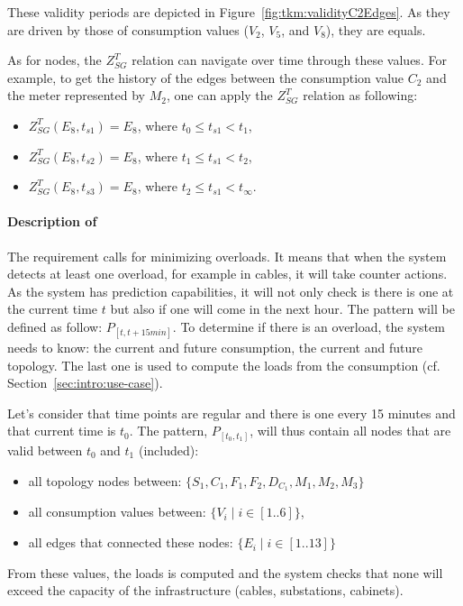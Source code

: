 These validity periods are depicted in Figure~\ref{fig:tkm:validityC2Edges}.
As they are driven by those of consumption values ($V_2$, $V_5$, and $V_8$), they are equals.

As for nodes, the $Z^T_{SG}$ relation can navigate over time through these values.
For example, to get the history of the edges between the consumption value $C_2$ and the meter represented by $M_2$, one can apply the $Z^T_{SG}$ relation as following:
\begin{itemize}
	\item $Z^T_{SG}(E_8, t_{s1}) = E_8$, where $t_0 \leqslant t_{s1} < t_1$,
	\item $Z^T_{SG}(E_8, t_{s2}) = E_8$, where $t_1 \leqslant t_{s1} < t_2$,
	\item $Z^T_{SG}(E_8, t_{s3}) = E_8$, where $t_2 \leqslant t_{s1} < t_\infty$.
\end{itemize}


\paragraph{Description of }
The requirement calls for minimizing overloads.
It means that when the system detects at least one overload, for example in cables, it will take counter actions.
As the system has prediction capabilities, it will not only check is there is one at the current time $t$ but also if one will come in the next hour.
The pattern will be defined as follow: $P_{[t, t+15min]}$.
To determine if there is an overload, the system needs to know: the current and future consumption, the current and future topology.
The last one is used to compute the loads from the consumption (cf. Section~\ref{sec:intro:use-case}).

Let's consider that time points are regular and there is one every 15 minutes and that current time is $t_0$.
The pattern, $P_{[t_0, t_1]}$, will thus contain all nodes that are valid between $t_0$ and $t_1$ (included):
\begin{itemize}
	\item all topology nodes between: $\{S_1, C_1, F_1, F_2, D_{C_1}, M_1, M_2, M_3\}$
	\item all consumption values between: $\{V_i \mid i \in [1..6]\}$,
	\item all edges that connected these nodes: $\{E_i \mid i \in [1..13]\}$
\end{itemize}

From these values, the loads is computed and the system checks that none will exceed the capacity of the infrastructure (cables, substations, cabinets).

